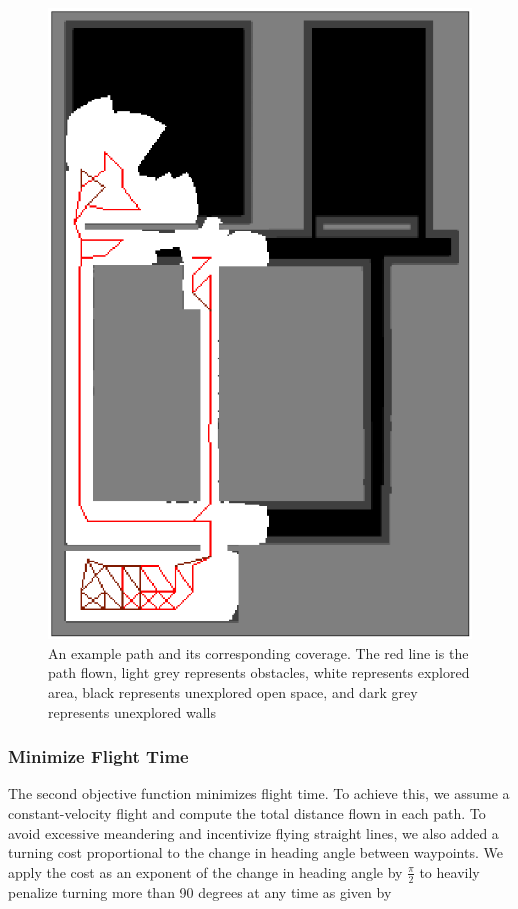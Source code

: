 \documentclass[letterpaper, 10 pt, conference]{ieeeconf}  %
\begin{document}
\begin{figure}
\centering
\includegraphics[width=0.8\linewidth]{coverage_map3.png}
\caption[An example coverage planner path and its corresponding coverage.]{An example path and its corresponding coverage. The red line is the path flown, light grey represents obstacles, white represents explored area, black represents unexplored open space, and dark grey represents unexplored walls}
\label{fig:coverage}
\end{figure}

\subsubsection{Minimize Flight Time}

The second objective function minimizes flight time. To achieve this, we assume a constant-velocity flight and compute the total distance flown in each path. To avoid excessive meandering and incentivize flying straight lines, we also added a turning cost proportional to the change in heading angle between waypoints. We apply the cost as an exponent of the change in heading angle by $\frac{\pi}{2}$ to heavily penalize turning more than 90 degrees at any time as given by
\end{document}
